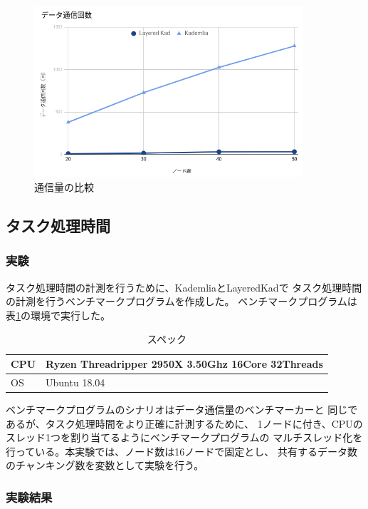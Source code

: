 \documentclass[sotsuron]{jcsie}
\begin{document}
\begin{figure}[H]
	\centering
	\includegraphics[width=10cm]{./assets/image/traffic_graph.png}
	\caption{通信量の比較}
	\label{fig:traffic-graph}
\end{figure}

\subsection{タスク処理時間}
\subsubsection{実験}
タスク処理時間の計測を行うために、KademliaとLayeredKadで
タスク処理時間の計測を行うベンチマークプログラムを作成した。
ベンチマークプログラムは表\ref{table:spec-ryzen}の環境で実行した。

\begin{table}[H]
	\caption{スペック}	
	\centering
	\label{table:spec-ryzen}
	\begin{tabular}{|l|l|}
		\hline
		CPU &   
		Ryzen Threadripper 2950X 3.50Ghz 16Core 32Threads \\ 
		\hline	
		OS  &   
		Ubuntu 18.04 \\ 
		\hline
	\end{tabular}	
\end{table}

ベンチマークプログラムのシナリオはデータ通信量のベンチマーカーと
同じであるが、タスク処理時間をより正確に計測するために、
1ノードに付き、CPUのスレッド1つを割り当てるようにベンチマークプログラムの
マルチスレッド化を行っている。本実験では、ノード数は16ノードで固定とし、
共有するデータ数のチャンキング数を変数として実験を行う。

\subsubsection{実験結果}
\end{document}
